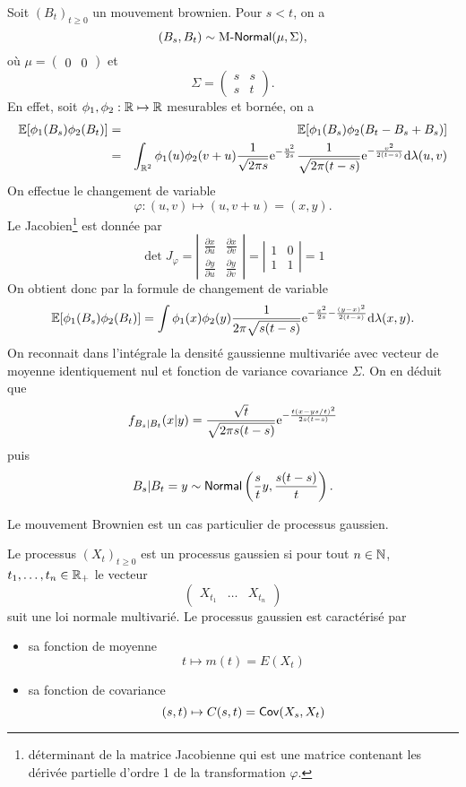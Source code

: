 \begin{ex}\label{ex:conditional_distribution_Bt}
Soit $(B_t)_{t\geq 0}$ un mouvement brownien. Pour $s < t$, on a 
$$
(B_s,B_t)\sim\text{M-}\mathsf{Normal}(\mu, \Sigma),
$$
où 
$\mu = (\begin{array}{cc}0&0\end{array})$ et 
$$
\Sigma = \left(\begin{array}{cc}s&s\\
s&t
\end{array}\right).
$$
En effet, soit $\phi_1, \phi_2:\mathbb{R}\mapsto \mathbb{R}$ mesurables et bornée, on a 
\begin{eqnarray*}
\mathbb{E}[\phi_1(B_s)\phi_2(B_t)] &=& \mathbb{E}[\phi_1(B_s)\phi_2(B_t - B_s + B_s)]\\
&=& \int_{\mathbb{R}^2}\phi_1(u)\phi_2(v+u)\frac{1}{\sqrt{2\pi s}}\mathrm{e}^{-\frac{u^2}{2s}}\frac{1}{\sqrt{2\pi (t-s)}}\mathrm{e}^{-\frac{v^2}{2(t-s)}}\text{d}\lambda(u,v)\\
\end{eqnarray*}
On effectue le changement de variable 
$$
\varphi:(u,v)\mapsto(u, v+u) = (x,y).
$$
Le Jacobien\footnote{déterminant de la matrice Jacobienne qui est une matrice contenant les dérivée partielle d'ordre 1 de la transformation $\varphi$.} est donnée par 
$$
\det J_\varphi= \left|\begin{array}{cc}\frac{\partial x}{\partial u}&\frac{\partial x}{\partial v}\\
\frac{\partial y}{\partial u}&\frac{\partial y}{\partial v}
\end{array}\right| = \left|\begin{array}{cc}1&0\\
1&1
\end{array}\right|
=1$$
On obtient donc par la formule de changement de variable
$$
\mathbb{E}[\phi_1(B_s)\phi_2(B_t)] = \int\phi_1(x)\phi_2(y)\frac{1}{2\pi \sqrt{s(t-s)}}\mathrm{e}^{-\frac{x^2}{2s}-\frac{(y-x)^2}{2(t-s)}}\text{d}\lambda(x,y).\\
$$
On reconnait dans l'intégrale la densité gaussienne multivariée avec vecteur de moyenne identiquement nul et fonction de variance covariance $\Sigma$. On en déduit que 
$$
f_{B_s|B_t}(x|y) = \frac{\sqrt{t}}{\sqrt{2\pi s(t-s)}}\mathrm{e}^{-\frac{t(x-ys/t)^2}{2s(t-s)}}
$$
puis 
$$
B_s|B_t=y\sim\mathsf{Normal}\left(\frac{s}{t}y, \frac{s(t-s)}{t}\right).
$$

\end{ex}
Le mouvement Brownien est un cas particulier de processus gaussien. 
\begin{definition}
Le processus $(X_t)_{t\geq 0}$ est un processus gaussien si pour tout $n\in\mathbb{N}$, $t_1,\ldots, t_n\in \mathbb{R}_+$ le vecteur
$$
(\begin{array}{ccc}X_{t_1}&\ldots &X_{t_n}\end{array})
$$
suit une loi normale multivarié. Le processus gaussien est caractérisé par 
\begin{itemize}
\item sa fonction de moyenne
$$
t\mapsto m(t)=E(X_t)
$$
\item sa fonction de covariance 
$$
(s,t)\mapsto C(s,t)=\mathsf{Cov}(X_s,X_t)
$$
\end{itemize}
\end{definition}

